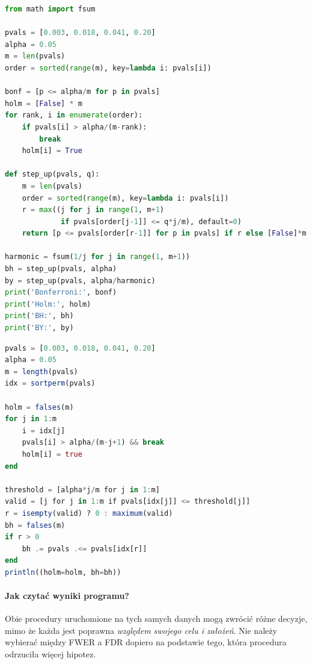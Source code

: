 \begin{lstlisting}[language=Python,caption={Kompletny program w Pythonie: Bonferroni, Holm, BH i BY bez zewnętrznych pakietów.}]
from math import fsum

pvals = [0.003, 0.018, 0.041, 0.20]
alpha = 0.05
m = len(pvals)
order = sorted(range(m), key=lambda i: pvals[i])

bonf = [p <= alpha/m for p in pvals]
holm = [False] * m
for rank, i in enumerate(order):
    if pvals[i] > alpha/(m-rank):
        break
    holm[i] = True

def step_up(pvals, q):
    m = len(pvals)
    order = sorted(range(m), key=lambda i: pvals[i])
    r = max((j for j in range(1, m+1)
             if pvals[order[j-1]] <= q*j/m), default=0)
    return [p <= pvals[order[r-1]] for p in pvals] if r else [False]*m

harmonic = fsum(1/j for j in range(1, m+1))
bh = step_up(pvals, alpha)
by = step_up(pvals, alpha/harmonic)
print('Bonferroni:', bonf)
print('Holm:', holm)
print('BH:', bh)
print('BY:', by)
\end{lstlisting}

\begin{lstlisting}[language=Julia,caption={Obliczenie krokowych korekt Holma i BH w Julii bez pakietów zewnętrznych.}]
pvals = [0.003, 0.018, 0.041, 0.20]
alpha = 0.05
m = length(pvals)
idx = sortperm(pvals)

holm = falses(m)
for j in 1:m
    i = idx[j]
    pvals[i] > alpha/(m-j+1) && break
    holm[i] = true
end

threshold = [alpha*j/m for j in 1:m]
valid = [j for j in 1:m if pvals[idx[j]] <= threshold[j]]
r = isempty(valid) ? 0 : maximum(valid)
bh = falses(m)
if r > 0
    bh .= pvals .<= pvals[idx[r]]
end
println((holm=holm, bh=bh))
\end{lstlisting}

\paragraph{Jak czytać wyniki programu?}
Obie procedury uruchomione na tych samych danych mogą
zwrócić różne decyzje, mimo że każda jest poprawna
\emph{względem swojego celu i założeń}. Nie należy
wybierać między FWER a FDR dopiero na podstawie
tego, która procedura odrzuciła więcej hipotez.

